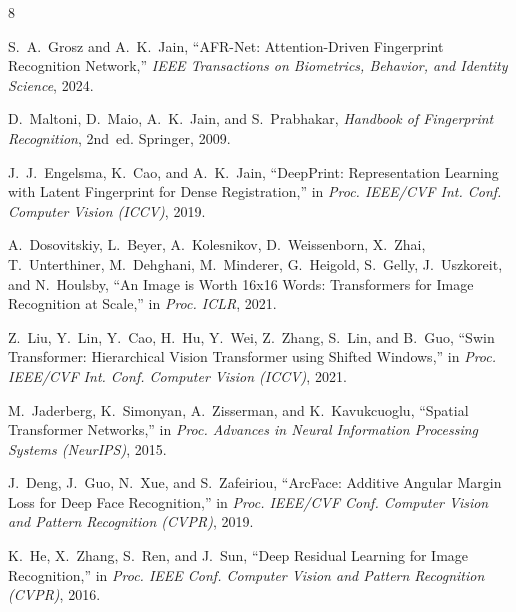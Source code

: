 \documentclass[conference]{IEEEtran}
\begin{document}
\begin{thebibliography}{8}

S.~A.~Grosz and A.~K.~Jain, ``AFR-Net: Attention-Driven Fingerprint Recognition Network,'' \textit{IEEE Transactions on Biometrics, Behavior, and Identity Science}, 2024.

D.~Maltoni, D.~Maio, A.~K.~Jain, and S.~Prabhakar, \textit{Handbook of Fingerprint Recognition}, 2nd~ed. Springer, 2009.

J.~J.~Engelsma, K.~Cao, and A.~K.~Jain, ``DeepPrint: Representation Learning with Latent Fingerprint for Dense Registration,'' in \textit{Proc. IEEE/CVF Int. Conf. Computer Vision (ICCV)}, 2019.

A.~Dosovitskiy, L.~Beyer, A.~Kolesnikov, D.~Weissenborn, X.~Zhai, T.~Unterthiner, M.~Dehghani, M.~Minderer, G.~Heigold, S.~Gelly, J.~Uszkoreit, and N.~Houlsby, ``An Image is Worth 16x16 Words: Transformers for Image Recognition at Scale,'' in \textit{Proc. ICLR}, 2021.

Z.~Liu, Y.~Lin, Y.~Cao, H.~Hu, Y.~Wei, Z.~Zhang, S.~Lin, and B.~Guo, ``Swin Transformer: Hierarchical Vision Transformer using Shifted Windows,'' in \textit{Proc. IEEE/CVF Int. Conf. Computer Vision (ICCV)}, 2021.

M.~Jaderberg, K.~Simonyan, A.~Zisserman, and K.~Kavukcuoglu, ``Spatial Transformer Networks,'' in \textit{Proc. Advances in Neural Information Processing Systems (NeurIPS)}, 2015.

J.~Deng, J.~Guo, N.~Xue, and S.~Zafeiriou, ``ArcFace: Additive Angular Margin Loss for Deep Face Recognition,'' in \textit{Proc. IEEE/CVF Conf. Computer Vision and Pattern Recognition (CVPR)}, 2019.

K.~He, X.~Zhang, S.~Ren, and J.~Sun, ``Deep Residual Learning for Image Recognition,'' in \textit{Proc. IEEE Conf. Computer Vision and Pattern Recognition (CVPR)}, 2016.

\end{thebibliography}
\end{document}
